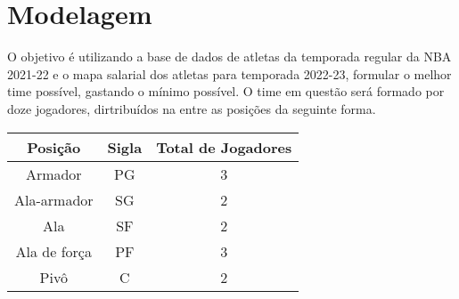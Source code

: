 \section{Modelagem}

O objetivo é utilizando a base de dados de atletas da temporada regular da NBA 2021-22 e o mapa salarial dos 
atletas para temporada 2022-23, formular o melhor time possível, gastando o mínimo possível. O time em questão 
será formado por doze jogadores, dirtribuídos na entre as posições da seguinte forma.
\begin{table}[h]
    \centering
    \begin{tabular}{|c|c|c|}
    \hline
    \textbf{Posição} & \textbf{Sigla} & \textbf{Total de Jogadores} \\ \hline
    Armador          & PG             & 3                           \\ \hline
    Ala-armador      & SG             & 2                           \\ \hline
    Ala              & SF             & 2                           \\ \hline
    Ala de força     & PF             & 3                           \\ \hline
    Pivô             & C              & 2                           \\ \hline
    \end{tabular}
\end{table}
